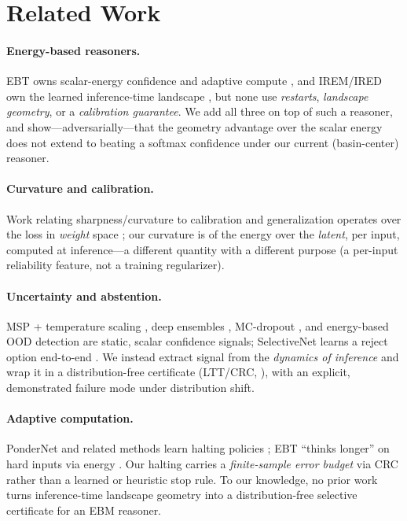 \section{Related Work}
\label{sec:related}

\paragraph{Energy-based reasoners.} EBT owns scalar-energy confidence and adaptive compute
\citep{ebt2025}, and IREM/IRED own the learned inference-time landscape \citep{irem2022,ired2024}, but
none use \emph{restarts}, \emph{landscape geometry}, or a \emph{calibration guarantee}. We add all
three on top of such a reasoner, and show---adversarially---that the geometry advantage over the
scalar energy does not extend to beating a softmax confidence under our current (basin-center)
reasoner.

\paragraph{Curvature and calibration.} Work relating sharpness/curvature to calibration and
generalization operates over the loss in \emph{weight} space \citep{sam2020,toosharp2026}; our
curvature is of the energy over the \emph{latent}, per input, computed at inference---a different
quantity with a different purpose (a per-input reliability feature, not a training regularizer).

\paragraph{Uncertainty and abstention.} MSP + temperature scaling \citep{tempscaling2017}, deep
ensembles \citep{deepensembles2017}, MC-dropout \citep{mcdropout2016}, and energy-based OOD detection
\citep{energyood2020} are static, scalar confidence signals; SelectiveNet learns a reject option
end-to-end \citep{selectivenet2019}. We instead extract signal from the \emph{dynamics of inference}
and wrap it in a distribution-free certificate (LTT/CRC, \citep{ltt2021,crc2022}), with an explicit,
demonstrated failure mode under distribution shift.

\paragraph{Adaptive computation.} PonderNet and related methods learn halting policies
\citep{pondernet2021}; EBT ``thinks longer'' on hard inputs via energy \citep{ebt2025}. Our halting
carries a \emph{finite-sample error budget} via CRC rather than a learned or heuristic stop rule. To
our knowledge, no prior work turns inference-time landscape geometry into a distribution-free
selective certificate for an EBM reasoner.
